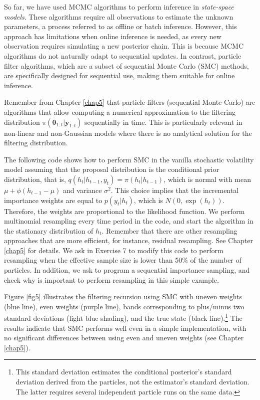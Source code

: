 So far, we have used MCMC algorithms to perform inference in \textit{state-space models}. These algorithms require all observations to estimate the unknown parameters, a process referred to as offline or batch inference. However, this approach has limitations when online inference is needed, as every new observation requires simulating a new posterior chain. This is because MCMC algorithms do not naturally adapt to sequential updates. In contrast, particle filter algorithms, which are a subset of sequential Monte Carlo (SMC) methods, are specifically designed for sequential use, making them suitable for online inference.    
     
Remember from Chapter \ref{chap5} that particle filters (sequential Monte Carlo) are algorithms that allow computing a numerical approximation to the filtering distribution $\pi(\bm{\theta}_{1:t}|\bm{y}_{1:t})$ sequentially in time. This is particularly relevant in non-linear and non-Gaussian models where there is no analytical solution for the filtering distribution.

The following code shows how to perform SMC in the vanilla stochastic volatility model assuming that the proposal distribution is the conditional prior distribution, that is, $q(h_t|h_{t-1},y_t)=\pi(h_t|h_{t-1})$, which is normal with mean $\mu+\phi(h_{t-1}-\mu)$ and variance $\sigma^2$. This choice implies that the incremental importance weights are equal to $p(y_t|h_t)$, which is $N(0,\exp(h_t))$. Therefore, the weights are proportional to the likelihood function. We perform multinomial resampling every time period in the code, and start the algorithm in the stationary distribution of $h_t$. Remember that there are other resampling approaches that are more efficient, for instance, residual resampling. See Chapter \ref{chap5} for details. We ask in Exercise 7 to modify this code to perform resampling when the effective sample size is lower than 50\% of the number of particles. In addition, we ask to program a sequential importance sampling, and check why is important to perform resampling in this simple example. 

Figure \ref{fig5} illustrates the filtering recursion using SMC with uneven weights (blue line), even weights (purple line), bands corresponding to plus/minus two standard deviations (light blue shading), and the true state (black line).\footnote{This standard deviation estimates the conditional posterior's standard deviation derived from the particles, not the estimator's standard deviation. The latter requires several independent particle runs on the same data.} The results indicate that SMC performs well even in a simple implementation, with no significant differences between using even and uneven weights (see Chapter \ref{chap5}).

